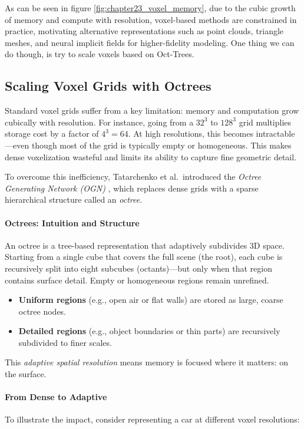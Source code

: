 As can be seen in figure \ref{fig:chapter23_voxel_memory}, due to the cubic growth of memory and compute with resolution, voxel-based methods are constrained in practice, motivating alternative representations such as point clouds, triangle meshes, and neural implicit fields for higher-fidelity modeling. One thing we can do though, is try to scale voxels based on Oct-Trees. 

\subsection{Scaling Voxel Grids with Octrees}
\label{subsec:chapter23_octrees}

Standard voxel grids suffer from a key limitation: memory and computation grow cubically with resolution. For instance, going from a \(32^3\) to \(128^3\) grid multiplies storage cost by a factor of \(4^3 = 64\). At high resolutions, this becomes intractable—even though most of the grid is typically empty or homogeneous. This makes dense voxelization wasteful and limits its ability to capture fine geometric detail.

To overcome this inefficiency, Tatarchenko et al.\ introduced the \emph{Octree Generating Network (OGN)} \cite{tatarchenko2017_ogn}, which replaces dense grids with a sparse hierarchical structure called an \emph{octree}.

\paragraph{Octrees: Intuition and Structure} 
An octree is a tree-based representation that adaptively subdivides 3D space. Starting from a single cube that covers the full scene (the root), each cube is recursively split into eight subcubes (octants)—but only when that region contains surface detail. Empty or homogeneous regions remain unrefined.

\begin{itemize}
    \item \textbf{Uniform regions} (e.g., open air or flat walls) are stored as large, coarse octree nodes.
    \item \textbf{Detailed regions} (e.g., object boundaries or thin parts) are recursively subdivided to finer scales.
\end{itemize}

This \emph{adaptive spatial resolution} means memory is focused where it matters: on the surface.

\paragraph{From Dense to Adaptive} 
To illustrate the impact, consider representing a car at different voxel resolutions:


